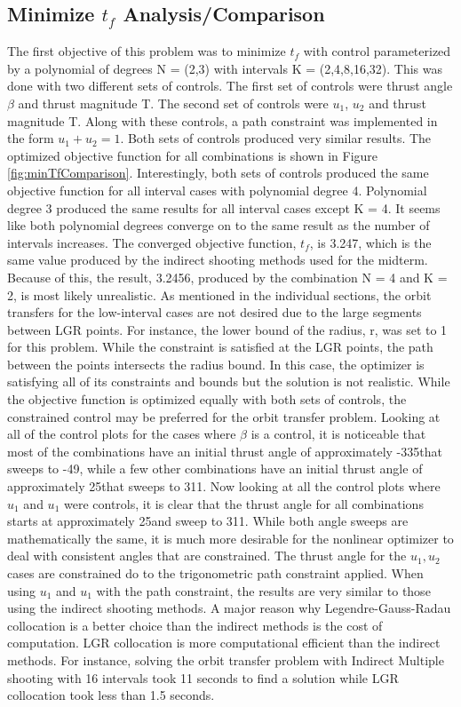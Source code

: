 \documentclass[]{article}
\begin{document}
	\subsection{Minimize \(t_f\) Analysis/Comparison}
	The first objective of this problem was to minimize \(t_f\) with control parameterized by a polynomial of degrees N = (2,3) with intervals K = (2,4,8,16,32). This was done with two different sets of controls. The first set of controls were thrust angle \(\beta\) and thrust magnitude T. The second set of controls were \(u_1\), \(u_2\) and thrust magnitude T. Along with these controls, a path constraint was implemented in the form \(u_1 + u_2 = 1\). Both sets of controls produced very similar results. The optimized objective function for all combinations is shown in Figure \ref{fig:minTfComparison}. Interestingly, both sets of controls produced the same objective function for all interval cases with polynomial degree 4. Polynomial degree 3 produced the same results for all interval cases except K = 4. It seems like both polynomial degrees converge on to the same result as the number of intervals increases. The converged objective function, \(t_f\), is 3.247, which is the same value produced by the indirect shooting methods used for the midterm. Because of this, the result, 3.2456, produced by the combination N = 4 and K = 2, is most likely unrealistic. As mentioned in the individual sections, the orbit transfers for the low-interval cases are not desired due to the large segments between LGR points. For instance, the lower bound of the radius, r, was set to 1 for this problem. While the constraint is satisfied at the LGR points, the path between the points intersects the radius bound. In this case, the optimizer is satisfying all of its constraints and bounds but the solution is not realistic. While the objective function is optimized equally with both sets of controls, the constrained control may be preferred for the orbit transfer problem. Looking at all of the control plots for the cases where \(\beta\) is a control, it is noticeable that most of the combinations have an initial thrust angle of approximately -335\degree that sweeps to -49\degree, while a few other combinations have an initial thrust angle of approximately 25\degree that sweeps to 311\degree. Now looking at all the control plots where \(u_1\) and \(u_1\) were controls, it is clear that the thrust angle for all combinations starts at approximately 25\degree and sweep to 311\degree. While both angle sweeps are mathematically the same, it is much more desirable for the nonlinear optimizer to deal with consistent angles that are constrained. The thrust angle for the \(u_1,u_2\) cases are constrained do to the trigonometric path constraint applied. When using \(u_1\) and \(u_1\) with the path constraint, the results are very similar to those using the indirect shooting methods. A major reason why Legendre-Gauss-Radau collocation is a better choice than the indirect methods is the cost of computation. LGR collocation is more computational efficient than the indirect methods. For instance, solving the orbit transfer problem with Indirect Multiple shooting with 16 intervals took 11 seconds to find a solution while LGR collocation took less than 1.5 seconds. 
\end{document}
